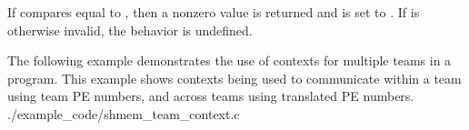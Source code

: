 \begin{apidefinition}
{  If  compares equal to ,
  then a nonzero value is returned and  is set to
  .
  If  is otherwise invalid, the behavior is undefined.
}


\begin{apiexamples}
    \apicexample
    {The following example demonstrates the use of contexts for multiple teams in a
    \CorCpp program. This example shows contexts being used to communicate within
    a team using team \ac{PE} numbers, and across teams using translated \ac{PE} numbers.}
    {./example_code/shmem_team_context.c}
    {}
\end{apiexamples}

\end{apidefinition}

